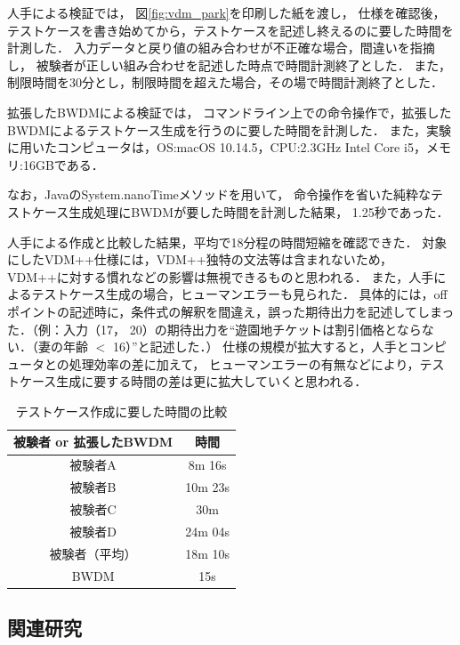 \documentclass[uplatex, report, a4j, 10pt]{jsbook}
\begin{document}
人手による検証では，
図\ref{fig:vdm_park}を印刷した紙を渡し，
仕様を確認後，
テストケースを書き始めてから，テストケースを記述し終えるのに要した時間を計測した．
入力データと戻り値の組み合わせが不正確な場合，間違いを指摘し，
被験者が正しい組み合わせを記述した時点で時間計測終了とした．
また，制限時間を30分とし，制限時間を超えた場合，その場で時間計測終了とした．

拡張したBWDMによる検証では，
コマンドライン上での命令操作で，拡張したBWDMによるテストケース生成を行うのに要した時間を計測した．
また，実験に用いたコンピュータは，OS:macOS 10.14.5，CPU:2.3GHz Intel Core i5，メモリ:16GBである．

なお，JavaのSystem.nanoTime\cite{nanotime}メソッドを用いて，
命令操作を省いた純粋なテストケース生成処理にBWDMが要した時間を計測した結果，
1.25秒であった．

人手による作成と比較した結果，平均で18分程の時間短縮を確認できた．
対象にしたVDM++仕様には，VDM++独特の文法等は含まれないため，
VDM++に対する慣れなどの影響は無視できるものと思われる．
また，人手によるテストケース生成の場合，ヒューマンエラーも見られた．
具体的には，offポイントの記述時に，条件式の解釈を間違え，誤った期待出力を記述してしまった．（例：入力（17， 20）の期待出力を“遊園地チケットは割引価格とならない．（妻の年齢 $<$ 16）”と記述した．）
仕様の規模が拡大すると，人手とコンピュータとの処理効率の差に加えて，
ヒューマンエラーの有無などにより，テストケース生成に要する時間の差は更に拡大していくと思われる．

\begin{table}[t]
  \begin{center}
   \caption{テストケース作成に要した時間の比較}
  \label{tab:time}
  \begin{tabular}{c|c}
   被験者 or 拡張したBWDM & 時間\\
   \hline
   \hline
   被験者A & 8m 16s \\
   被験者B & 10m 23s \\
   被験者C & 30m \\
   被験者D & 24m 04s \\
   被験者（平均）& 18m 10s \\ 
   BWDM & 15s \\
   \hline
  \end{tabular}
  \end{center}
  \end{table}

\subsection{関連研究}

\end{document}
